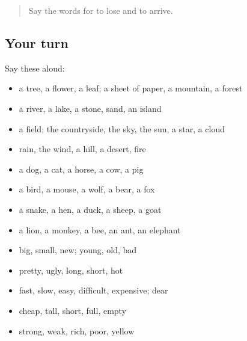 \label{lesson:PT-R81-first-pass-nature-animals-and-describing-words}



\begin{quote}
Say the words for to lose and to arrive.
\end{quote}

\subsection*{Your turn}
Say these aloud:

\begin{itemize}
\raggedright
  \item a tree, a flower, a leaf; a sheet of paper, a mountain, a forest
  \item a river, a lake, a stone, sand, an island
  \item a field; the countryside, the sky, the sun, a star, a cloud
  \item rain, the wind, a hill, a desert, fire
  \item a dog, a cat, a horse, a cow, a pig
  \item a bird, a mouse, a wolf, a bear, a fox
  \item a snake, a hen, a duck, a sheep, a goat
  \item a lion, a monkey, a bee, an ant, an elephant
  \item big, small, new; young, old, bad
  \item pretty, ugly, long, short, hot
  \item fast, slow, easy, difficult, expensive; dear
  \item cheap, tall, short, full, empty
  \item strong, weak, rich, poor, yellow
\end{itemize}

